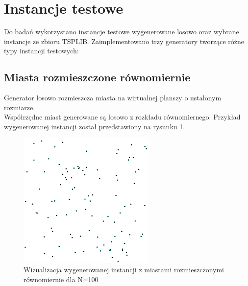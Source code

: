 \section{Instancje testowe}
Do badań wykorzystano instancje testowe wygenerowane losowo oraz wybrane instancje ze zbioru TSPLIB.
Zaimplementowano trzy generatory tworzące różne typy instancji testowych:

\subsection*{Miasta rozmieszczone równomiernie}
Generator losowo rozmieszcza miasta na wirtualnej planszy o ustalonym rozmiarze.\\
Współrzędne miast generowane są losowo z rozkładu równomiernego.
Przykład wygenerowanej instancji został przedstawiony na rysunku \ref{fig:uniform_example}.
\begin{figure}[h!]
    \centering
    \includegraphics[width=0.60\textwidth]{chapters/experiments/img/uniform_example.png}
    \caption{Wizualizacja wygenerowanej instancji z miastami rozmieszczonymi równomiernie dla N=100}
    \label{fig:uniform_example}
\end{figure}

